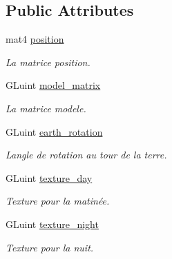 \subsection*{Public Attributes}
\begin{DoxyCompactItemize}
\item 
\mbox{\label{classEarth_a05a0f1a429f32b6d91be8b6b0325e043}} 
mat4 \mbox{\hyperlink{classEarth_a05a0f1a429f32b6d91be8b6b0325e043}{position}}
\begin{DoxyCompactList}\small\item\em La matrice position. \end{DoxyCompactList}\item 
\mbox{\label{classEarth_a23f243526b68042e166ece9c6fd2ac27}} 
G\+Luint \mbox{\hyperlink{classEarth_a23f243526b68042e166ece9c6fd2ac27}{model\+\_\+matrix}}
\begin{DoxyCompactList}\small\item\em La matrice modele. \end{DoxyCompactList}\item 
\mbox{\label{classEarth_a2837b51a68cae97630bf43c89a932fe6}} 
G\+Luint \mbox{\hyperlink{classEarth_a2837b51a68cae97630bf43c89a932fe6}{earth\+\_\+rotation}}
\begin{DoxyCompactList}\small\item\em L\textquotesingle{}angle de rotation au tour de la terre. \end{DoxyCompactList}\item 
\mbox{\label{classEarth_a13d70083ad4c9322eb28503927622ba4}} 
G\+Luint \mbox{\hyperlink{classEarth_a13d70083ad4c9322eb28503927622ba4}{texture\+\_\+day}}
\begin{DoxyCompactList}\small\item\em Texture pour la matinée. \end{DoxyCompactList}\item 
\mbox{\label{classEarth_ad83d9351423dc37314ca3e7193964142}} 
G\+Luint \mbox{\hyperlink{classEarth_ad83d9351423dc37314ca3e7193964142}{texture\+\_\+night}}
\begin{DoxyCompactList}\small\item\em Texture pour la nuit. \end{DoxyCompactList}\end{DoxyCompactItemize}
